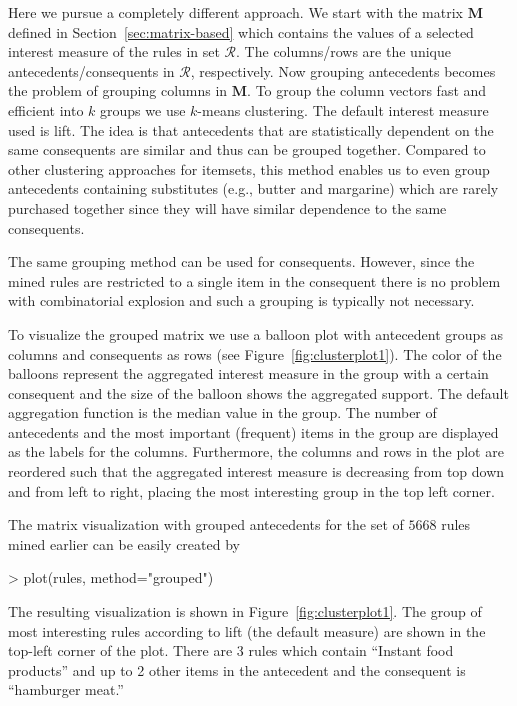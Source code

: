 \documentclass[nojss]{jss}
\newcommand{\set}[1]{\mathcal{#1}}
\newcommand{\mat}[1]{\mathbf{#1}}
\begin{document}
Here we pursue a completely different approach.
We start with the matrix
$\mat{M}$
defined in Section~\ref{sec:matrix-based} which
contains the values of a selected interest measure of the rules
in set $\set{R}$. The columns/rows are the unique antecedents/consequents
in $\set{R}$, respectively.
Now grouping antecedents becomes the problem of grouping columns
in $\mat{M}$. To group the column vectors
fast and efficient into $k$ groups we use $k$-means clustering.
The default interest measure used is lift. The idea is that
antecedents that are statistically dependent on the same consequents
are similar and thus can be grouped together.
Compared to other clustering approaches for itemsets,
this method enables
us to even group antecedents containing substitutes
(e.g., butter and margarine)
which are rarely purchased together
since they will have similar dependence to the same consequents.

The same grouping method can be used for consequents. However,
since the mined rules
are restricted to a single item in the
consequent
there is no problem with combinatorial explosion and
such a grouping is typically not necessary.

To visualize the grouped matrix we use a balloon plot with antecedent
groups as columns and consequents as rows (see Figure~\ref{fig:clusterplot1}).
The color of the balloons
represent the aggregated interest measure in the group
with a certain consequent and the size of the balloon shows
the aggregated support. The default aggregation function is the median
value in the group. The number of antecedents
and the most important (frequent) items in the group are displayed
as the labels for the columns.
Furthermore, the columns and rows in the plot are reordered such that
the aggregated interest measure is decreasing from top down
and from left to right, placing the most interesting group in the
top left corner.

The matrix visualization with grouped antecedents
for the set of $5668$ rules mined earlier
can be easily created by
\begin{Schunk}
\begin{Sinput}
> plot(rules, method="grouped")
\end{Sinput}
\end{Schunk}

The resulting visualization is shown in Figure~\ref{fig:clusterplot1}.
The group of most interesting rules according to lift (the default measure)
are shown in the top-left corner of the plot. There are 3 rules
which contain ``Instant food products'' and up to 2 other items in the
antecedent and the consequent is ``hamburger meat.''
\end{document}
